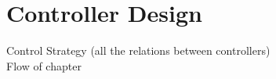 \chapter{Controller Design}

Control Strategy (all the relations between controllers)\\
Flow of chapter\\